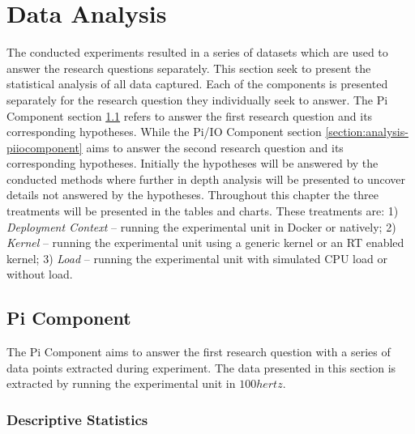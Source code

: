 \iffalse  \fi
\chapter{Data Analysis}\label{section:data-analysis}

The conducted experiments resulted in a series of datasets which are used to answer the research questions separately. This section seek to present the statistical analysis of all data captured. Each of the components is presented separately for the research question they individually seek to answer. The Pi Component section \ref{section:analysis-picomponent} refers to answer the first research question and its corresponding hypotheses. While the Pi/IO Component section \ref{section:analysis-piiocomponent} aims to answer the second research question and its corresponding hypotheses. Initially the hypotheses will be answered by the conducted methods where further in depth analysis will be presented to uncover details not answered by the hypotheses. Throughout this chapter the three treatments will be presented in the tables and charts. These treatments are: 1) \textit{Deployment Context} – running the experimental unit in Docker or natively; 2) \textit{Kernel} – running the experimental unit using a generic kernel or an RT enabled kernel; 3) \textit{Load} – running the experimental unit with simulated CPU load or without load.


\section{Pi Component}
\label{section:analysis-picomponent}

The Pi Component aims to answer the first research question with a series of data points extracted during experiment. The data presented in this section is extracted by running the experimental unit in $100hertz$.


\subsection{Descriptive Statistics}
\label{section:analysis-picomponent-desc}

